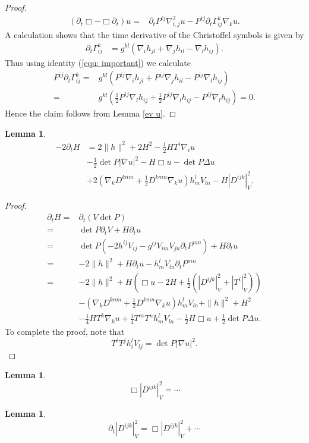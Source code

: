 \documentclass{amsart}
\newtheorem{lemma}[theorem]{Lemma}
\theoremstyle{definition}
\theoremstyle{remark}
\numberwithin{equation}{section}
\begin{document}
\begin{proof}
\begin{align*}
(\partial_t \Box-\Box \partial_t)u
=&\partial_tP^{ij}\nabla^2_{i,j}u-P^{ij}\partial_t\Gamma_{ij}^k\nabla_ku.
\end{align*}
A calculation shows that the time derivative of the Christoffel symbols is given by
\begin{align*}
\partial_t \Gamma_{ij}^k&=g^{kl}\left(\nabla_ih_{jl}+\nabla_jh_{il}-\nabla_{l}h_{ij}\right).
\end{align*}
Thus using identity (\ref{equ: important}) we calculate
\begin{align*}
P^{ij}\partial_t \Gamma_{ij}^k=&g^{kl}\left(P^{ij}\nabla_ih_{jl}+P^{ij}\nabla_jh_{il}-P^{ij}\nabla_{l}h_{ij}\right)\\
=&g^{kl}\left(\frac{1}{2}P^{ij}\nabla_lh_{ij}+\frac{1}{2}P^{ij}\nabla_lh_{ij}-P^{ij}\nabla_{l}h_{ij}\right)=0.
\end{align*}
Hence the claim follows from Lemma \ref{ev u}.
\end{proof}
\begin{lemma}
\begin{align*}
-2\partial_tH&=2\|h\|^2+2H^2-\frac{1}{2}HT^i\nabla_iu
\\&-\frac{1}{2}\det P |\nabla u|^2
-H\Box u-\det P\Delta u\\
&+2\left(\nabla_kD^{knm}+\frac{1}{2}D^{kmn}\nabla_ku\right)h_m^lV_{ln}
-H\left|D^{ijk}\right|_V^2.
\end{align*}
\end{lemma}
\begin{proof}
\begin{align*}
\partial_tH=&\partial_t(V\det P)\\
=&\det P\partial_t V+H\partial_tu\\
=&\det P(-2h^{ij}V_{ij}-g^{ij}V_{im}V_{jn}\partial_tP^{mn})+H\partial_tu\\
=&-2\|h\|^2+H\partial_tu-h_m^lV_{ln}\partial_tP^{mn}\\
=&-2\|h\|^2+H\left(\Box u-2H+\frac{1}{2}\left(\left|D^{ijk}\right|^2_V+\left|T^i\right|_V^2\right)\right)\\
&-\left(\nabla_kD^{knm}+\frac{1}{2}D^{kmn}\nabla_ku\right)h_m^lV_{ln}+\|h\|^2+H^2\\
&-\frac{1}{4}HT^k\nabla_ku+\frac{1}{4}T^mT^nh_m^lV_{ln}-\frac{1}{2}H\Box u+\frac{1}{2}\det P\Delta u.
\end{align*}
To complete the proof, note that
\[T^iT^jh_i^lV_{lj}=\det P|\nabla u|^2.\]
\end{proof}
\begin{lemma}
\[\Box\left|D^{ijk}\right|^2_V=\cdots\]
\end{lemma}
\begin{lemma}
\[\partial_t\left|D^{ijk}\right|^2_V=\Box\left|D^{ijk}\right|^2_V+\cdots\]
\end{lemma}
\end{document}
